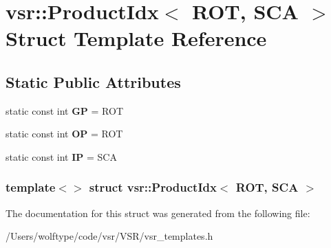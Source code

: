 \hypertarget{structvsr_1_1_product_idx_3_01_r_o_t_00_01_s_c_a_01_4}{\section{vsr\-:\-:Product\-Idx$<$ R\-O\-T, S\-C\-A $>$ Struct Template Reference}
\label{structvsr_1_1_product_idx_3_01_r_o_t_00_01_s_c_a_01_4}
}
\subsection*{Static Public Attributes}
\begin{DoxyCompactItemize}
\item 
\hypertarget{structvsr_1_1_product_idx_3_01_r_o_t_00_01_s_c_a_01_4_a91a424c937513334962ac5d8578c7e60}{static const int {\bfseries G\-P} = R\-O\-T}\label{structvsr_1_1_product_idx_3_01_r_o_t_00_01_s_c_a_01_4_a91a424c937513334962ac5d8578c7e60}

\item 
\hypertarget{structvsr_1_1_product_idx_3_01_r_o_t_00_01_s_c_a_01_4_a6401a7b2e974047d3401a3ce8837026b}{static const int {\bfseries O\-P} = R\-O\-T}\label{structvsr_1_1_product_idx_3_01_r_o_t_00_01_s_c_a_01_4_a6401a7b2e974047d3401a3ce8837026b}

\item 
\hypertarget{structvsr_1_1_product_idx_3_01_r_o_t_00_01_s_c_a_01_4_a665ce4be7c6a58828fe7512f8646c72c}{static const int {\bfseries I\-P} = S\-C\-A}\label{structvsr_1_1_product_idx_3_01_r_o_t_00_01_s_c_a_01_4_a665ce4be7c6a58828fe7512f8646c72c}

\end{DoxyCompactItemize}
\subsubsection*{template$<$$>$ struct vsr\-::\-Product\-Idx$<$ R\-O\-T, S\-C\-A $>$}



The documentation for this struct was generated from the following file\-:\begin{DoxyCompactItemize}
\item 
/\-Users/wolftype/code/vsr/\-V\-S\-R/vsr\-\_\-templates.\-h\end{DoxyCompactItemize}
